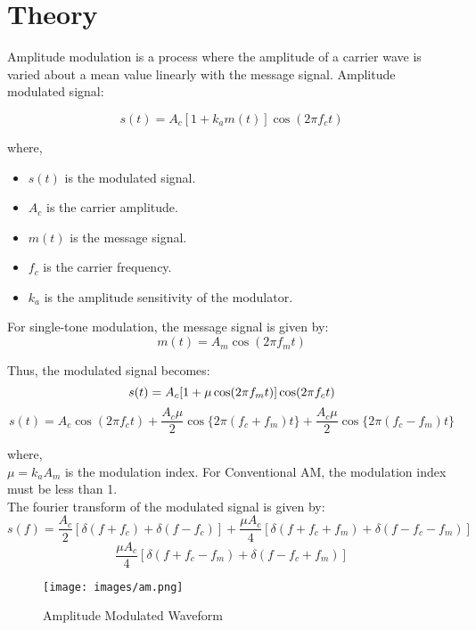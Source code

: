 \section*{Theory}

Amplitude modulation is a process where the amplitude of a carrier
wave is varied about a mean value linearly with the message signal. Amplitude modulated signal:

\begin{equation}
    s(t) = A_c[1 + k_a m(t)]\cos(2\pi f_c t)
\end{equation}

where,\\
\begin{itemize}
    \item $s(t)$ is the modulated signal.
    \item $A_c$ is the carrier amplitude.
    \item $m(t)$ is the message signal.
    \item $f_c$ is the carrier frequency.
    \item $k_a$ is the amplitude sensitivity of the modulator.
\end{itemize}

For single-tone modulation, the message signal is given by:
\begin{equation}
    m(t) = A_m \cos(2\pi f_m t)
\end{equation}

Thus, the modulated signal becomes:
\begin{equation}
    s(t) = A_c[1 + \mu \cos(2\pi f_m t)]\cos(2\pi f_c t) \\
\end{equation}
\begin{equation}
    s(t) = A_c\cos(2\pi f_c t) + \frac{A_c\mu}{2}\cos\{2\pi (f_c + f_m) t\} + \frac{A_c\mu}{2}\cos\{2\pi (f_c - f_m) t\}
    \label{eq:single_am}
\end{equation}

where,\\
$\mu = k_a A_m$ is the modulation index.
For Conventional AM, the modulation index must be less than 1.\\

The fourier transform of the modulated signal is given by:
\[
    s(f)=\frac{A_c}{2}[\delta(f+f_c) + \delta(f-f_c)] + \frac{\mu A_c}{4}[\delta(f+f_c+f_m) + \delta(f-f_c-f_m)] 
\]
\begin{equation}
    \frac{\mu A_c}{4}[\delta(f+f_c-f_m) + \delta(f-f_c+f_m)]
    \label{eq:single_am_fft}
\end{equation}

\begin{figure}
    \centering
    \texttt{[image: images/am.png]}
    \caption{Amplitude Modulated Waveform}
    \label{fig:am_waveform}
\end{figure}

